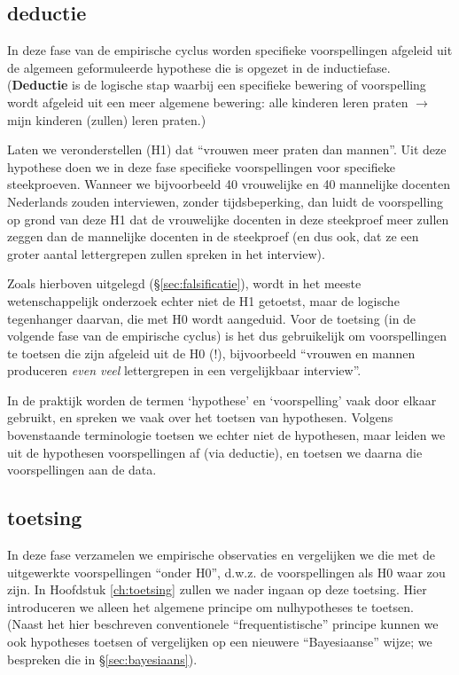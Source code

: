 \documentclass[
]{book}
\begin{document}
\hypertarget{deductie}{%
\subsection{deductie}\label{deductie}}

In deze fase van de empirische cyclus worden specifieke voorspellingen
afgeleid uit de algemeen geformuleerde hypothese die is opgezet in de
inductiefase. (\textbf{Deductie} is de logische stap waarbij een specifieke
bewering of voorspelling wordt afgeleid uit een meer algemene bewering:
alle kinderen leren praten \(\rightarrow\) mijn kinderen (zullen) leren
praten.)

Laten we veronderstellen (H1) dat ``vrouwen meer praten dan mannen''. Uit
deze hypothese doen we in deze fase specifieke voorspellingen voor
specifieke steekproeven. Wanneer we bijvoorbeeld 40 vrouwelijke en 40
mannelijke docenten Nederlands zouden interviewen, zonder
tijdsbeperking, dan luidt de voorspelling op grond van deze H1 dat de
vrouwelijke docenten in deze steekproef meer zullen zeggen dan de
mannelijke docenten in de steekproef (en dus ook, dat ze een groter
aantal lettergrepen zullen spreken in het interview).

Zoals hierboven uitgelegd (§\ref{sec:falsificatie}), wordt in het meeste wetenschappelijk
onderzoek echter niet de H1 getoetst, maar de logische tegenhanger
daarvan, die met H0 wordt aangeduid.
Voor de toetsing (in de volgende fase van de empirische
cyclus) is het dus gebruikelijk om voorspellingen te toetsen die zijn
afgeleid uit de H0 (!), bijvoorbeeld ``vrouwen en mannen produceren \emph{even veel} lettergrepen in een vergelijkbaar interview''.

In de praktijk worden de termen `hypothese' en `voorspelling' vaak door
elkaar gebruikt, en spreken we vaak over het toetsen van hypothesen.
Volgens bovenstaande terminologie toetsen we echter niet de hypothesen, maar leiden we uit de hypothesen voorspellingen af (via deductie), en toetsen we daarna die voorspellingen aan de data.

\hypertarget{toetsing}{%
\subsection{toetsing}\label{toetsing}}

In deze fase verzamelen we empirische observaties en vergelijken we die
met de uitgewerkte voorspellingen ``onder H0'', d.w.z. de voorspellingen
als H0 waar zou zijn. In Hoofdstuk \ref{ch:toetsing} zullen we nader ingaan op deze toetsing. Hier introduceren we alleen het algemene principe om nulhypotheses te toetsen. (Naast het hier beschreven conventionele ``frequentistische'' principe kunnen we ook hypotheses toetsen of vergelijken op een nieuwere ``Bayesiaanse'' wijze; we bespreken die in §\ref{sec:bayesiaans}).
\end{document}
